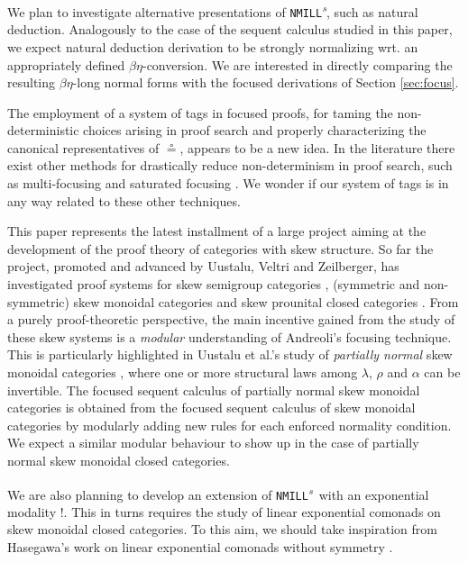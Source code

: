 \documentclass[submission,copyright,creativecommons]{eptcs}
\theoremstyle{definition}
\newcommand{\NMILL}{\texttt{NMILL}}
\newcommand{\SkNMILL}{\NMILL\textsuperscript{\textit{s}}}
\begin{document}
We plan to investigate alternative presentations of \SkNMILL, such as natural deduction. Analogously to the case of the sequent calculus studied in this paper, we expect natural deduction derivation to be strongly normalizing wrt. an appropriately defined $\beta\eta$-conversion. We are interested in directly comparing the resulting $\beta\eta$-long normal forms with the focused derivations of Section \ref{sec:focus}.

The employment of a system of tags in focused proofs, for taming the non-deterministic choices arising in proof search and properly characterizing the canonical representatives of $\circeq$, appears to be a new idea. In the literature there exist other methods for drastically reduce non-determinism in proof search, such as multi-focusing \cite{chaudhuri:canonical:2008} and saturated focusing \cite{scherer:simple:2015}. We wonder if our system of tags is in any way related to these other techniques.

This paper represents the latest installment of a large project aiming at the development of the proof theory of categories with skew structure. So far the project, promoted and advanced by Uustalu, Veltri and Zeilberger, has investigated proof systems for skew semigroup categories \cite{zeilberger:semiassociative:19}, (symmetric and non-symmetric) skew monoidal categories \cite{uustalu:sequent:2021,uustalu:proof:nodate,veltri:coherence:2021} and skew prounital closed categories \cite{uustalu:deductive:nodate}. From a purely proof-theoretic perspective, the main incentive gained from the study of these skew systems is a \emph{modular} understanding of Andreoli's focusing technique. This is particularly highlighted in Uustalu et al.'s study of \emph{partially normal} skew monoidal categories \cite{uustalu:proof:nodate}, where one or more structural laws among $\lambda$, $\rho$ and $\alpha$ can be invertible. The focused sequent calculus of partially normal skew monoidal categories is obtained from the focused sequent calculus of skew monoidal categories by modularly adding new rules for each enforced normality condition.
We expect a similar modular behaviour to show up in the case of partially normal skew monoidal closed categories.

We are also planning to develop an extension of \SkNMILL\ with an exponential modality !. This in turns requires the study of linear exponential comonads on skew monoidal closed categories. To this aim, we should take inspiration from Hasegawa's work on linear exponential comonads without symmetry \cite{hasegawa:linear:2017}. 

  
  
\end{document}
